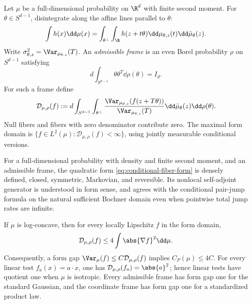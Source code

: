 \documentclass[../../main.tex]{subfiles}
\begin{document}
Let $\mu$ be a full-dimensional probability on $\R^d$ with finite second moment. For
$\theta\in S^{d-1}$, disintegrate along the affine lines parallel to $\theta$:
\[
  \int h(x)\dd\mu(x)
  =\int_{\theta^\perp}\int_\R h(z+t\theta)
    \dd\mu_{\theta,z}(t)\dd\bar\mu_\theta(z).
\]
Write $\sigma_{\theta,z}^2=\Var_{\mu_{\theta,z}}(T)$. An \emph{admissible frame} is an even
Borel probability $\rho$ on $S^{d-1}$ satisfying
\begin{equation}\label{eq:conditional-frame-isotropy}
  d\int_{S^{d-1}}\theta\theta^T\dd\rho(\theta)=I_d.
\end{equation}
For such a frame define
\begin{equation}\label{eq:conditional-fiber-form}
  \mathcal D_{\mu,\rho}(f)
  :=d\int_{S^{d-1}}\int_{\theta^\perp}
  \frac{\Var_{\mu_{\theta,z}}(f(z+T\theta))}
       {\Var_{\mu_{\theta,z}}(T)}
  \dd\bar\mu_\theta(z)\dd\rho(\theta).
\end{equation}
Null fibers and fibers with zero denominator contribute zero. The maximal form domain is
$\{f\in L^2(\mu):\mathcal D_{\mu,\rho}(f)<\infty\}$, using jointly measurable conditional
versions.

\begin{lemma}
\label{lem:conditional-fiber-form}
For a full-dimensional probability with density and finite second moment, and an admissible
frame, the quadratic form
\eqref{eq:conditional-fiber-form} is densely defined, closed, symmetric, Markovian, and
reversible. Its nonlocal self-adjoint generator is understood in form sense, and agrees with the
conditional pair-jump formula on the natural sufficient Bochner domain even when pointwise total
jump rates are infinite.

If $\mu$ is log-concave, then for every locally Lipschitz $f$ in the form domain,
\begin{equation}\label{eq:conditional-fiber-gradient-comparison}
  \mathcal D_{\mu,\rho}(f)
  \le4\int\abs{\nabla f}^2\dd\mu.
\end{equation}
Consequently, a form gap
$\Var_\mu(f)\le C\mathcal D_{\mu,\rho}(f)$ implies $C_P(\mu)\le4C$.
For every linear test $f_a(x)=a\cdot x$, one has
$\mathcal D_{\mu,\rho}(f_a)=\abs{a}^2$; hence linear tests have quotient one when $\mu$ is
isotropic. Every admissible frame has form gap one for the standard Gaussian, and the coordinate
frame has form gap one for a standardized product law.
\end{lemma}
\end{document}
